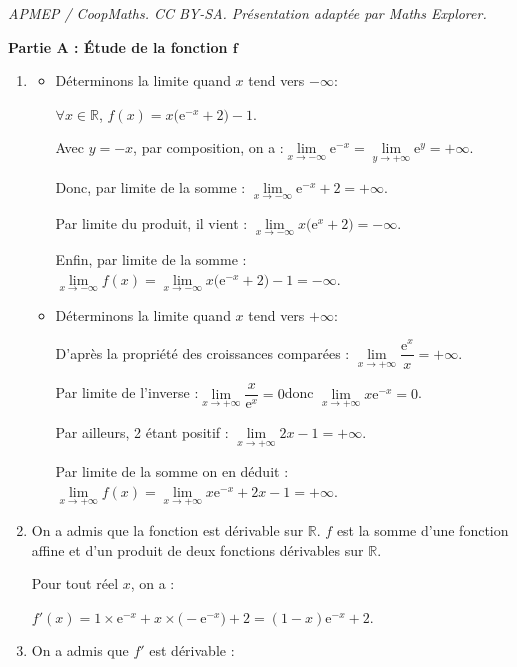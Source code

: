 \documentclass[10pt]{article}
\providecommand{\R}{\mathbb{R}}
\providecommand{\e}{{\mathrm{e}}}
\begin{document}
\noindent\textit{APMEP / CoopMaths. CC BY-SA. Présentation adaptée par Maths Explorer.}\par\medskip
\medskip

\textbf{Partie A : Étude de la fonction $\boldsymbol{f}$}

\begin{enumerate}
\item
\begin{itemize}
\item Déterminons la limite quand $x$ tend vers $-\infty$:

$\forall x \in \R$, \quad $f(x) = x\big(\e^{-x} + 2\big) - 1$.

Avec $y = -x$, par composition, on a :\quad $\lim\limits_{x \to -\infty} \e^{-x}= \lim\limits_{y \to +\infty} \e^{y} = +\infty$.

Donc, par limite de la somme : \quad $\lim\limits_{x \to -\infty} \e^{-x} + 2 = +\infty$.

Par limite du produit, il vient : \quad $\lim\limits_{x \to -\infty} x\big(\e^{x} + 2\big) = -\infty$.

Enfin, par limite de la somme : \quad $\lim\limits_{x \to -\infty} f(x) = \lim\limits_{x \to -\infty} x\big(\e^{-x} + 2\big) - 1 = -\infty$.

\item Déterminons la limite quand $x$ tend vers $+\infty$:

D'après la propriété des croissances comparées : \quad$ \lim\limits_{x \to +\infty} \dfrac{\e^{x}}{x} = +\infty$.

Par limite de l'inverse :\quad$\lim\limits_{x \to +\infty} \dfrac{x}{\e^{x}} = 0$\quad donc $\lim\limits_{x \to +\infty} x\e^{-x} = 0$.

Par ailleurs, 2 étant positif : \quad $\lim\limits_{x \to +\infty}2x-1 = +\infty$.

Par limite de la somme on en déduit :\quad $\lim\limits_{x \to +\infty} f(x) = \lim\limits_{x \to +\infty} x\e^{-x} + 2 x-1 = +\infty$.
\end{itemize}

\item On a admis que la fonction est dérivable sur $\R$. $f$ est la somme d'une fonction affine et d'un produit de deux fonctions dérivables sur $\R$.

Pour tout réel $x$, on a :

$f'(x) = 1 \times \e^{-x} + x \times \big(-\e^{-x}\big) + 2 = (1 - x)\e^{-x} + 2$.

\item On a admis que $f'$ est dérivable :


\end{enumerate}
\end{document}
